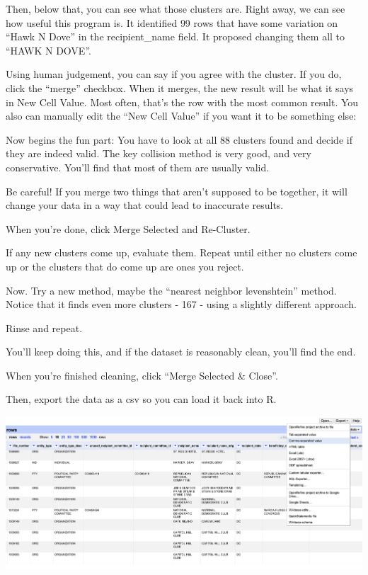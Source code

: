 \documentclass[
  letterpaper,
  DIV=11,
  numbers=noendperiod]{scrreprt}
\begin{document}
Then, below that, you can see what those clusters are. Right away, we
can see how useful this program is. It identified 99 rows that have some
variation on ``Hawk N Dove'' in the recipient\_name field. It proposed
changing them all to ``HAWK N DOVE''.

Using human judgement, you can say if you agree with the cluster. If you
do, click the ``merge'' checkbox. When it merges, the new result will be
what it says in New Cell Value. Most often, that's the row with the most
common result. You also can manually edit the ``New Cell Value'' if you
want it to be something else:

Now begins the fun part: You have to look at all 88 clusters found and
decide if they are indeed valid. The key collision method is very good,
and very conservative. You'll find that most of them are usually valid.

Be careful! If you merge two things that aren't supposed to be together,
it will change your data in a way that could lead to inaccurate results.

When you're done, click Merge Selected and Re-Cluster.

If any new clusters come up, evaluate them. Repeat until either no
clusters come up or the clusters that do come up are ones you reject.

Now. Try a new method, maybe the ``nearest neighbor levenshtein''
method. Notice that it finds even more clusters - 167 - using a slightly
different approach.

Rinse and repeat.

You'll keep doing this, and if the dataset is reasonably clean, you'll
find the end.

When you're finished cleaning, click ``Merge Selected \& Close''.

Then, export the data as a csv so you can load it back into R.

\includegraphics{./images/open7.png}
\end{document}

